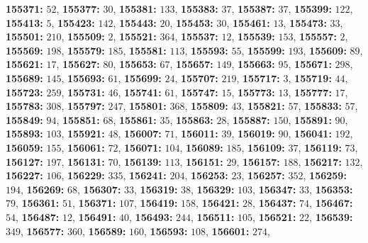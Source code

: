 \textsf{\bfseries 155371:} $52$, \textsf{\bfseries 155377:} $30$, \textsf{\bfseries 155381:} $133$, \textsf{\bfseries 155383:} $37$, \textsf{\bfseries 155387:} $37$, \textsf{\bfseries 155399:} $122$, \textsf{\bfseries 155413:} $5$, \textsf{\bfseries 155423:} $142$, \textsf{\bfseries 155443:} $20$, \textsf{\bfseries 155453:} $30$, \textsf{\bfseries 155461:} $13$, \textsf{\bfseries 155473:} $33$, \textsf{\bfseries 155501:} $210$, \textsf{\bfseries 155509:} $2$, \textsf{\bfseries 155521:} $364$, \textsf{\bfseries 155537:} $12$, \textsf{\bfseries 155539:} $153$, \textsf{\bfseries 155557:} $2$, \textsf{\bfseries 155569:} $198$, \textsf{\bfseries 155579:} $185$, \textsf{\bfseries 155581:} $113$, \textsf{\bfseries 155593:} $55$, \textsf{\bfseries 155599:} $193$, \textsf{\bfseries 155609:} $89$, \textsf{\bfseries 155621:} $17$, \textsf{\bfseries 155627:} $80$, \textsf{\bfseries 155653:} $67$, \textsf{\bfseries 155657:} $149$, \textsf{\bfseries 155663:} $95$, \textsf{\bfseries 155671:} $298$, \textsf{\bfseries 155689:} $145$, \textsf{\bfseries 155693:} $61$, \textsf{\bfseries 155699:} $24$, \textsf{\bfseries 155707:} $219$, \textsf{\bfseries 155717:} $3$, \textsf{\bfseries 155719:} $44$, \textsf{\bfseries 155723:} $259$, \textsf{\bfseries 155731:} $46$, \textsf{\bfseries 155741:} $61$, \textsf{\bfseries 155747:} $15$, \textsf{\bfseries 155773:} $13$, \textsf{\bfseries 155777:} $17$, \textsf{\bfseries 155783:} $308$, \textsf{\bfseries 155797:} $247$, \textsf{\bfseries 155801:} $368$, \textsf{\bfseries 155809:} $43$, \textsf{\bfseries 155821:} $57$, \textsf{\bfseries 155833:} $57$, \textsf{\bfseries 155849:} $94$, \textsf{\bfseries 155851:} $68$, \textsf{\bfseries 155861:} $35$, \textsf{\bfseries 155863:} $28$, \textsf{\bfseries 155887:} $150$, \textsf{\bfseries 155891:} $90$, \textsf{\bfseries 155893:} $103$, \textsf{\bfseries 155921:} $48$, \textsf{\bfseries 156007:} $71$, \textsf{\bfseries 156011:} $39$, \textsf{\bfseries 156019:} $90$, \textsf{\bfseries 156041:} $192$, \textsf{\bfseries 156059:} $155$, \textsf{\bfseries 156061:} $72$, \textsf{\bfseries 156071:} $104$, \textsf{\bfseries 156089:} $185$, \textsf{\bfseries 156109:} $37$, \textsf{\bfseries 156119:} $73$, \textsf{\bfseries 156127:} $197$, \textsf{\bfseries 156131:} $70$, \textsf{\bfseries 156139:} $113$, \textsf{\bfseries 156151:} $29$, \textsf{\bfseries 156157:} $188$, \textsf{\bfseries 156217:} $132$, \textsf{\bfseries 156227:} $106$, \textsf{\bfseries 156229:} $335$, \textsf{\bfseries 156241:} $204$, \textsf{\bfseries 156253:} $23$, \textsf{\bfseries 156257:} $352$, \textsf{\bfseries 156259:} $194$, \textsf{\bfseries 156269:} $68$, \textsf{\bfseries 156307:} $33$, \textsf{\bfseries 156319:} $38$, \textsf{\bfseries 156329:} $103$, \textsf{\bfseries 156347:} $33$, \textsf{\bfseries 156353:} $79$, \textsf{\bfseries 156361:} $51$, \textsf{\bfseries 156371:} $107$, \textsf{\bfseries 156419:} $158$, \textsf{\bfseries 156421:} $28$, \textsf{\bfseries 156437:} $74$, \textsf{\bfseries 156467:} $54$, \textsf{\bfseries 156487:} $12$, \textsf{\bfseries 156491:} $40$, \textsf{\bfseries 156493:} $244$, \textsf{\bfseries 156511:} $105$, \textsf{\bfseries 156521:} $22$, \textsf{\bfseries 156539:} $349$, \textsf{\bfseries 156577:} $360$, \textsf{\bfseries 156589:} $160$, \textsf{\bfseries 156593:} $108$, \textsf{\bfseries 156601:} $274$, 
